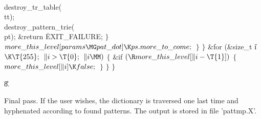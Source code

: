 \\{destroy\_tr\_table}(\\{tt});\6
\\{destroy\_pattern\_trie}(\\{pt});\6
\&{return} \.{EXIT\_FAILURE};\6
\4${}\}{}$\2\6
${}\\{more\_this\_level}[\\{params}\MG\\{pat\_dot}]\K\\{ps}.\\{more\_to%
\_come};{}$\6
\4${}\}{}$\2\6
\4${}\}{}$\2\6
\&{for} (\&{size\_t} \|i${}\K\T{255};{}$ ${}\|i>\T{0};{}$ ${}\|i\MM){}$\5
${}\{{}$\1\6
\&{if} ${}(\R\\{more\_this\_level}[\|i-\T{1}]){}$\5
${}\{{}$\1\6
${}\\{more\_this\_level}[\|i]\K\\{false};{}$\6
\4${}\}{}$\2\6
\4${}\}{}$\2\6
\4${}\}{}$\2\par
\U8.\fi

Final pass.
If the user wishes, the dictionary is traversed one last time and hyphenated
according to found patterns. The output is
stored in file 'pattmp.X'.

